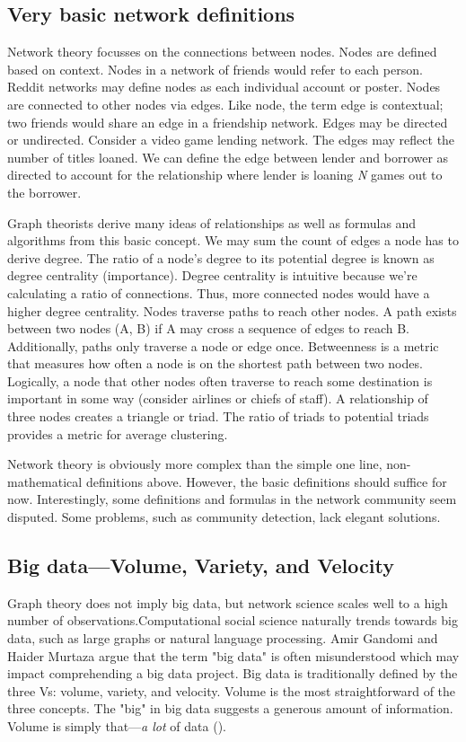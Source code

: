 \documentclass[12pt, a4paper]{article}
\begin{document}
\subsection{Very basic network definitions}
Network theory focusses on the connections between nodes. Nodes are defined based on context. Nodes in a network of friends would refer to each person. Reddit networks may define nodes as each individual account or poster. Nodes are connected to other nodes via edges. Like node, the term edge is contextual; two friends would share an edge in a friendship network. Edges may be directed or undirected. Consider a video game lending network. The edges may reflect the number of titles loaned. We can define the edge between lender and borrower as directed to account for the relationship where lender is loaning \textit{N} games out to the borrower.

Graph theorists derive many ideas of relationships as well as formulas and algorithms from this basic concept. We may sum the count of edges a node has to derive degree. The ratio of a node's degree to its potential degree is known as degree centrality (importance). Degree centrality is intuitive because we're calculating a ratio of connections. Thus, more connected nodes would have a higher degree centrality. Nodes traverse paths to reach other nodes. A path exists between two nodes (A, B) if A may cross a sequence of edges to reach B. Additionally, paths only traverse a node or edge once. Betweenness is a metric that measures how often a node is on the shortest path between two nodes. Logically, a node that other nodes often traverse to reach some destination is important in some way (consider airlines or chiefs of staff). A relationship of three nodes creates a triangle or triad. The ratio of triads to potential triads provides a metric for average clustering.

Network theory is obviously more complex than the simple one line, non-mathematical definitions above. However, the basic definitions should suffice for now. Interestingly, some definitions and formulas in the network community seem disputed. Some problems, such as community detection, lack elegant solutions.

\subsection{Big data---Volume, Variety, and Velocity}
Graph theory does not imply big data, but network science scales well to a high number of observations.Computational social science naturally trends towards big data, such as large graphs or natural language processing. Amir Gandomi and Haider Murtaza argue that the term "big data" is often misunderstood which may impact comprehending a big data project. Big data is traditionally defined by the three Vs: volume, variety, and velocity. Volume is the most straightforward of the three concepts. The "big" in big data suggests a generous amount of information. Volume is simply that---\textit{a lot} of data (\cite{gandomiamir2015}).
\end{document}
